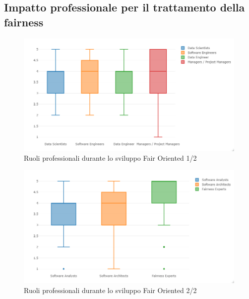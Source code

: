     \subsection{Impatto professionale per il trattamento della fairness}
	\begin{center}
		\hspace*{-5mm}%
	\end{center}
	
	  \begin{figure}[h!]
        \centering
        \includegraphics[width=1\textwidth]{figure/Analisi/RQ2/RoleImpactBoxPlot1.png}
        \caption{Ruoli professionali durante lo sviluppo Fair Oriented 1/2}
    \end{figure}
    
     \begin{figure}[h!]
        \centering
        \includegraphics[width=1\textwidth]{figure/Analisi/RQ2/RoleImpactBoxPlot2.png}
        \caption{Ruoli professionali durante lo sviluppo Fair Oriented 2/2}
    \end{figure}
	 
